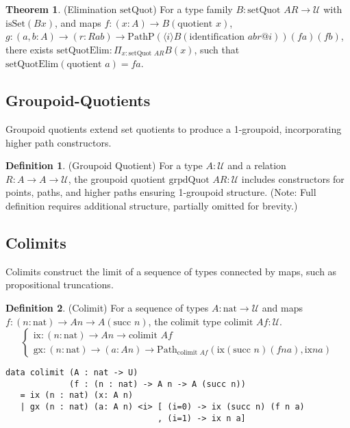 \documentclass{article}
\theoremstyle{definition}
\newtheorem{theorem}{Theorem}
\newtheorem{definition}{Definition}
\begin{document}
\begin{theorem} (Elimination $\text{setQuot}$)
For a type family $B : \text{setQuot } A R \to \mathcal{U}$ with $\text{isSet}(B x)$, and maps $f : (x : A) \to B(\text{quotient } x)$, $g : (a, b : A) \to (r : R a b) \to \text{PathP} (\langle i \rangle B(\text{identification } a b r @ i)) (f a) (f b)$, there exists $\text{setQuotElim} : \Pi_{x:\text{setQuot } A R} B(x)$, such that $\text{setQuotElim}(\text{quotient } a) = f a$.
\end{theorem}

\subsection{Groupoid-Quotients}
Groupoid quotients extend set quotients to produce a 1-groupoid, incorporating higher path constructors.

\begin{definition} (Groupoid Quotient)
For a type $A : \mathcal{U}$ and a relation $R : A \to A \to \mathcal{U}$, the groupoid quotient $\text{grpdQuot } A R : \mathcal{U}$ includes constructors for points, paths, and higher paths ensuring 1-groupoid structure. (Note: Full definition requires additional structure, partially omitted for brevity.)
\end{definition}

\newpage

\subsection{Colimits}
Colimits construct the limit of a sequence of types connected by maps, such as propositional truncations.

\begin{definition} (Colimit)
For a sequence of types $A : \text{nat} \to \mathcal{U}$ and maps $f : (n : \text{nat}) \to A n \to A (\text{succ } n)$, the colimit type $\text{colimit } A f : \mathcal{U}$.
\[
\begin{cases}
\text{ix} : (n : \text{nat}) \to A n \to \text{colimit } A f \\
\text{gx} : (n : \text{nat}) \to (a : A n) \to \text{Path}_{\text{colimit } A f} (\text{ix} (\text{succ } n) (f n a), \text{ix} n a)
\end{cases}
\]
\begin{lstlisting}
data colimit (A : nat -> U)
             (f : (n : nat) -> A n -> A (succ n))
   = ix (n : nat) (x: A n)
   | gx (n : nat) (a: A n) <i> [ (i=0) -> ix (succ n) (f n a)
                               , (i=1) -> ix n a]
\end{lstlisting}
\end{definition}
\end{document}
